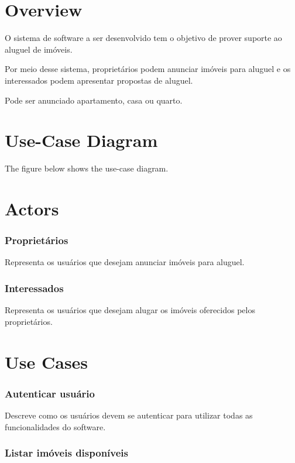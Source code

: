 \section*{Overview}

O sistema de software a ser desenvolvido tem o objetivo de prover suporte ao aluguel de imóveis.

Por meio desse sistema, proprietários podem anunciar imóveis para aluguel e os interessados podem apresentar propostas de aluguel. 

Pode ser anunciado apartamento, casa ou quarto.

\section*{Use-Case Diagram}

The figure below shows the use-case diagram.

\section*{Actors}

\subsubsection*{Proprietários}

Representa os usuários que desejam anunciar imóveis para aluguel.

\subsubsection*{Interessados}

Representa os usuários que desejam alugar os imóveis oferecidos pelos proprietários.

\section*{Use Cases}

\subsubsection*{Autenticar usuário}

Descreve como os usuários devem se autenticar para utilizar todas as funcionalidades do software.

\subsubsection*{Listar imóveis disponíveis}

